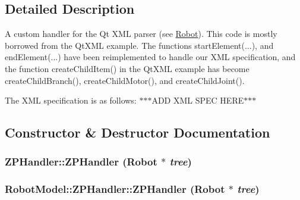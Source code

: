\subsection{Detailed Description}
A custom handler for the Qt XML parser (see \hyperlink{class_robot_model_1_1_robot}{Robot}). This code is mostly borrowed from the QtXML example. The functions startElement(...), and endElement(...) have been reimplemented to handle our XML specification, and the function createChildItem() in the QtXML example has become createChildBranch(), createChildMotor(), and createChildJoint().

The XML specification is as follows: $\ast$$\ast$$\ast$ADD XML SPEC HERE$\ast$$\ast$$\ast$ 

\subsection{Constructor \& Destructor Documentation}
\hypertarget{class_robot_model_1_1_z_p_handler_aa418554ca19e4c6f79cf7c2b3e747723}{
\subsubsection[{ZPHandler}]{\setlength{\rightskip}{0pt plus 5cm}ZPHandler::ZPHandler ({\bf Robot} $\ast$ {\em tree})}}
\label{class_robot_model_1_1_z_p_handler_aa418554ca19e4c6f79cf7c2b3e747723}
\hypertarget{class_robot_model_1_1_z_p_handler_a190c3fda1bc3ad017b9b2e44744c3057}{
\subsubsection[{ZPHandler}]{\setlength{\rightskip}{0pt plus 5cm}RobotModel::ZPHandler::ZPHandler ({\bf Robot} $\ast$ {\em tree})}}
\label{class_robot_model_1_1_z_p_handler_a190c3fda1bc3ad017b9b2e44744c3057}


